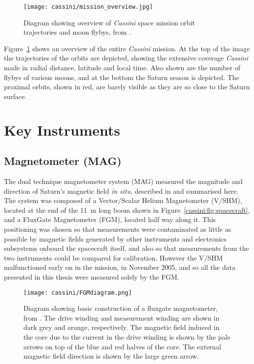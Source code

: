 \begin{figure}
\centering
\noindent\texttt{[image: cassini/mission\_overview.jpg]}
\caption[Diagram showing overview of \textit{Cassini }space mission.]{Diagram showing overview of \textit{Cassini} space mission orbit trajectories and moon flybys, from \citet{nasa2017}.}
\label{cassini:fig:missionoverview}
\end{figure}

Figure~\ref{cassini:fig:missionoverview} shows an overview of the entire \textit{Cassini} mission. At the top of the image the trajectories of the orbits are depicted, showing the extensive coverage \textit{Cassini} made in radial distance, latitude and local time. Also shown are the number of flybys of various moons, and at the bottom the Saturn season is depicted. The proximal orbits, shown in red, are barely visible as they are so close to the Saturn surface.

\section{Key Instruments}
\subsection{Magnetometer (MAG)}
The dual technique magnetometer system (MAG) measured the magnitude and direction of Saturn's magnetic field \textit{in situ}, described in \citet{dougherty2004} and summarised here. The system was composed of a Vector/Scalar Helium Magnetometer (V/SHM), located at the end of the \SI{11}{m} long boom shown in Figure~\ref{cassini:fig:spacecraft}, and a FluxGate Magnetometer (FGM), located half way along it. This positioning was chosen so that measurements were contaminated as little as possible by magnetic fields generated by other instruments and electronics subsystems onboard the spacecraft itself, and also so that measurements from the two instruments could be compared for calibration. However the V/SHM malfunctioned early on in the mission, in November 2005, and so all the data presented in this thesis were measured solely by the FGM.

\begin{figure}
\centering
\noindent\texttt{[image: cassini/FGMdiagram.png]}
\caption[Diagram of how a fluxgate magnetometer works.]{Diagram showing basic construction of a fluxgate magnetometer, from \citet{carisma2018}. The drive winding and measurement winding are shown in dark grey and orange, respectively. The magnetic field induced in the core due to the current in the drive winding is shown by the pale arrows on top of the blue and red halves of the core. The external magnetic field direction is shown by the large green arrow.}
\label{cassini:fig:FGMdiagram}
\end{figure}

